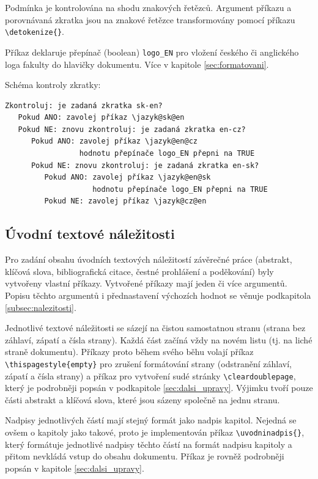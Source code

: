 Podmínka je kontrolována na shodu znakových řetězců. Argument příkazu a porovnávaná zkratka jsou na znakové řetězce transformovány pomocí příkazu \verb|\detokenize{}|.

Příkaz deklaruje přepínač (boolean) \verb|logo_EN| pro vložení českého či anglického loga fakulty do hlavičky dokumentu. Více v kapitole \ref{sec:formatovani}.

Schéma kontroly zkratky:

\begin{verbatim}
Zkontroluj: je zadaná zkratka sk-en?
   Pokud ANO: zavolej příkaz \jazyk@sk@en
   Pokud NE: znovu zkontroluj: je zadaná zkratka en-cz?
      Pokud ANO: zavolej příkaz \jazyk@en@cz
                 hodnotu přepínače logo_EN přepni na TRUE
      Pokud NE: znovu zkontroluj: je zadaná zkratka en-sk?
         Pokud ANO: zavolej příkaz \jazyk@en@sk
                    hodnotu přepínače logo_EN přepni na TRUE
         Pokud NE: zavolej příkaz \jazyk@cz@en
\end{verbatim}



\subsection{Úvodní textové náležitosti}
\label{subsec:nalezitosti_sablona}
Pro zadání obsahu úvodních textových náležitostí závěrečné práce (abstrakt, klíčová slova, bibliografická citace, čestné prohlášení a poděkování) byly vytvořeny vlastní příkazy. Vytvořené příkazy mají jeden či více argumentů. Popisu těchto argumentů i přednastavení výchozích hodnot se věnuje podkapitola \ref{subsec:nalezitosti}.

Jednotlivé textové náležitosti se sázejí na čistou samostatnou stranu (strana bez záhlaví, zápatí a čísla strany). Každá část začíná vždy na novém listu (tj. na liché straně dokumentu). Příkazy proto během svého běhu volají příkaz \verb|\thispagestyle{empty}| pro zrušení formátování strany (odstranění záhlaví, zápatí a čísla strany) a příkaz pro  vytvoření sudé stránky \verb|\cleardoublepage|, který je podrobněji popsán v podkapitole \ref{sec:dalsi_upravy}. Výjimku tvoří pouze části abstrakt a klíčová slova, které jsou sázeny společně na jednu stranu.

Nadpisy jednotlivých částí mají stejný formát jako nadpis kapitol. Nejedná se ovšem o kapitoly jako takové, proto je implementován příkaz \verb|\uvodninadpis{}|, který formátuje jednotlivé nadpisy těchto částí na formát nadpisu kapitoly a přitom nevkládá vstup do obsahu dokumentu. Příkaz je rovněž podrobněji popsán v kapitole \ref{sec:dalsi_upravy}.

